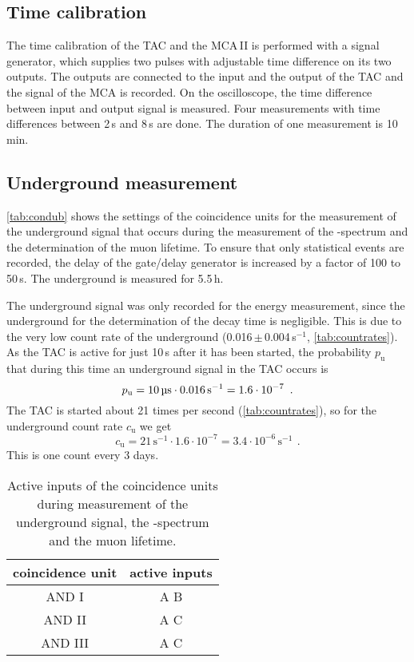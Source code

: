 \subsection{Time calibration}
The time calibration of the TAC and the MCA\,II is performed
with a signal generator,
which supplies two pulses with adjustable time difference on its two outputs.
The outputs are connected to the input and the output of the TAC and the signal
of the MCA is recorded.
On the oscilloscope, the time difference between input and output signal is measured.
Four measurements with time differences between 2\,\textmu s and 8\,\textmu s are done.
The duration of one measurement is 10\,min.


\subsection{Underground measurement}
\autoref{tab:condub} shows the settings of the coincidence units for the measurement of the underground
signal that occurs during the measurement of the \textbeta-spectrum and the determination of the muon lifetime.
To ensure that only statistical events are recorded, the delay of the gate/delay generator is increased by 
a factor of 100 to 50\,\textmu s. The underground is measured for 5.5\,h.

The underground signal was only recorded for the energy measurement,
since the underground for the determination of the decay time is negligible.
This is due to the very low count rate of the underground (0.016\,$\pm$\,0.004\,s$^{-1}$, \autoref{tab:countrates}).
As the TAC is active for just 10\,\textmu s after it has been started, the probability $p_\text{u}$
that during this time an underground signal in the TAC occurs is
\begin{equation}
    p_\text{u}=10\,\text{\textmu s} \cdot 0.016\,\text{s}^{-1}=1.6 \cdot 10^{-7} \ \, .
\end{equation}
The TAC is started about 21 times per second (\autoref{tab:countrates}),
so for the underground count rate $c_\text{u}$ we get
\begin{equation}
    c_\text{u}=21\,\text{s}^{-1}\cdot1.6\cdot10^{-7}=3.4\cdot10^{-6}\,\text{s}^{-1} \ \, .
\end{equation}
This is one count every 3 days.

\begin{table}[H]
\caption{Active inputs of the coincidence units during measurement of the underground signal,
the \textbeta-spectrum and the muon lifetime.}
\begin{center}
\begin{tabular}{|c|c|}
  \hline
  coincidence unit	& active inputs	\\ \hline\hline
  AND I				& A B			\\ \hline
  AND II			& A	C			\\ \hline
  AND III			& A C			\\ \hline
 \end{tabular}
\end{center}
\label{tab:condub}
\end{table}


